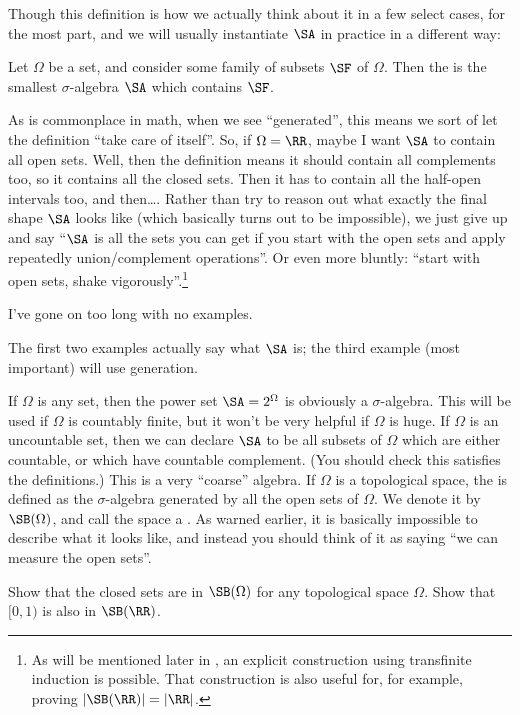Though this definition is how we actually think about it in a few select cases,
for the most part, and we will usually instantiate $\SA$ in practice
in a different way:
\begin{definition}
	Let $\Omega$ be a set, and consider some family of subsets $\SF$ of $\Omega$.
	Then the 
	is the smallest $\sigma$-algebra $\SA$ which contains $\SF$.
\end{definition}
As is commonplace in math, when we see ``generated'',
this means we sort of let the definition ``take care of itself''.
So, if $\Omega = \RR$, maybe I want $\SA$ to contain all open sets.
Well, then the definition means it should contain all complements too,
so it contains all the closed sets.
Then it has to contain all the half-open intervals too, and then\dots.
Rather than try to reason out what exactly the final shape $\SA$ looks like
(which basically turns out to be impossible),
we just give up and say ``$\SA$ is all the sets you can get if you start
with the open sets and apply repeatedly union/complement operations''.
Or even more bluntly: ``start with open sets, shake vigorously''.\footnote{As
	will be mentioned later in ,
	an explicit construction using transfinite induction is possible.
	That construction is also useful for, for example, proving $|\SB(\RR)| = |\RR|$.}

I've gone on too long with no examples.
\begin{example}
	The first two examples actually say what $\SA$ is;
	the third example (most important) will use generation.
	\begin{enumerate}[(a)]
		\ii If $\Omega$ is any set,
		then the power set $\SA = 2^{\Omega}$ is obviously a $\sigma$-algebra.
		This will be used if $\Omega$ is countably finite,
		but it won't be very helpful if $\Omega$ is huge.
		\ii If $\Omega$ is an uncountable set,
		then we can declare $\SA$ to be all subsets of $\Omega$
		which are either countable,
		or which have countable complement.
		(You should check this satisfies the definitions.)
		This is a very ``coarse'' algebra.
		\ii If $\Omega$ is a topological space,
		the 
		is defined as the $\sigma$-algebra generated by all the open sets of $\Omega$.
		We denote it by $\SB(\Omega)$,
		and call the space a .
		As warned earlier, it is basically impossible to describe
		what it looks like,
		and instead you should think of it as saying
		``we can measure the open sets''.
	\end{enumerate}
\end{example}
\begin{ques}
	Show that the closed sets are in $\SB(\Omega)$ for
	any topological space $\Omega$.
	Show that $[0,1)$ %
	is also in $\SB(\RR)$.
\end{ques}

